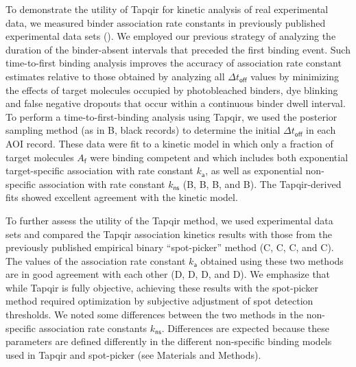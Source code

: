 To demonstrate the utility of Tapqir for kinetic analysis of real experimental data, we measured binder association rate constants in previously published experimental data sets ().  We employed our previous strategy  \citep{Friedman2012-if,Friedman2015-nx} of analyzing the duration of the binder-absent intervals that preceded the first binding event.  Such time-to-first binding analysis improves the accuracy of association rate constant estimates relative to those obtained by analyzing all $\Delta t_\mathsf{off}$ values by minimizing the effects of target molecules occupied by photobleached binders, dye blinking and false negative dropouts that occur within a continuous binder dwell interval.  To perform a time-to-first-binding analysis using Tapqir, we used the posterior sampling method (as in B, black records) to determine the initial $\Delta t_\mathsf{off}$ in each AOI record. These data were fit to a kinetic model \citep{Friedman2012-if,Friedman2015-nx} in which only a fraction of target molecules $A_\mathsf{f}$ were binding competent and which includes both exponential target-specific association with rate constant $k_\mathsf{a}$, as well as exponential non-specific association with rate constant $k_\mathsf{ns}$ (B, B, B, and B).  The Tapqir-derived fits showed excellent agreement with the kinetic model.  

To further assess the utility of the Tapqir method, we used experimental data sets and compared the Tapqir association kinetics results with those from the previously published empirical binary ``spot-picker'' method \citep{Friedman2015-nx} (C, C, C, and C). The values of the association rate constant $k_\mathsf{a}$ obtained using these two methods are in good agreement with each other (D, D, D, and D). We emphasize that while Tapqir is fully objective, achieving these results with the spot-picker method required optimization by subjective adjustment of spot detection thresholds.  We noted some differences between the two methods in the non-specific association rate constants $k_\mathsf{ns}$. Differences are expected because these parameters are defined differently in the different non-specific binding models used in Tapqir and  spot-picker (see Materials and Methods).





